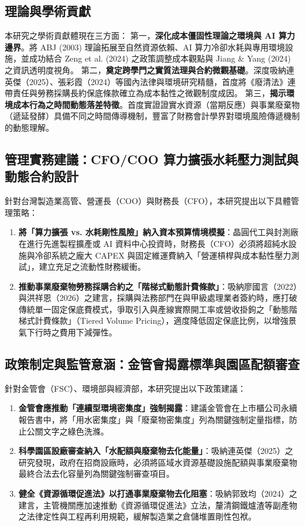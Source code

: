 \documentclass[12pt,a4paper]{article}
\begin{document}
\subsection{理論與學術貢獻}

本研究之學術貢獻體現在三方面：
第一，\textbf{深化成本僵固性理論之環境與 AI 算力邊界}。將 ABJ (2003) 理論拓展至自然資源依賴、AI 算力冷卻水耗與專用環境設施，並成功結合 Zeng et al. (2024) 之政策調整成本觀點與 Jiang \& Yang (2024) 之資訊透明度視角。
第二，\textbf{奠定跨學門之實質法理與合約微觀基礎}。深度吸納連英傑（2025）、張彩霞（2024）等國內法律與環境研究精髓，首度將《廢清法》連帶責任與勞務採購長約保底條款確立為成本黏性之微觀制度成因。
第三，\textbf{揭示環境成本行為之時間動態落差特徵}。首度實證證實水資源（當期反應）與事業廢棄物（遞延發酵）具備不同之時間傳導機制，豐富了財務會計學界對環境風險傳遞機制的動態理解。

\subsection{管理實務建議：CFO/COO 算力擴張水耗壓力測試與動態合約設計}

針對台灣製造業高管、營運長（COO）與財務長（CFO），本研究提出以下具體管理策略：

\begin{enumerate}[leftmargin=*]
    \item \textbf{將「算力擴張 vs. 水耗剛性風險」納入資本預算情境模擬}：晶圓代工與封測廠在進行先進製程擴產或 AI 資料中心投資時，財務長（CFO）必須將超純水設施與冷卻系統之龐大 CAPEX 與固定維運費納入「營運槓桿與成本黏性壓力測試」，建立充足之流動性財務緩衝。
    \item \textbf{推動事業廢棄物勞務採購合約之「階梯式動態計費條款」}：吸納廖國言（2022）與洪祥恩（2026）之建言，採購與法務部門在與甲級處理業者簽約時，應打破傳統單一固定保底費模式，爭取引入與產線實際開工率或營收掛鉤之「動態階梯式計費條款」（Tiered Volume Pricing），適度降低固定保底比例，以增強景氣下行時之費用下減彈性。
\end{enumerate}

\subsection{政策制定與監管意涵：金管會揭露標準與園區配額審查}

針對金管會（FSC）、環境部與經濟部，本研究提出以下政策建議：

\begin{enumerate}[leftmargin=*]
    \item \textbf{金管會應推動「連續型環境密集度」強制揭露}：建議金管會在上市櫃公司永續報告書中，將「用水密集度」與「廢棄物密集度」列為關鍵強制定量指標，防止公關文字之綠色洗滌。
    \item \textbf{科學園區設廠審查納入「水配額與廢棄物去化能量」}：吸納連英傑（2025）之研究發現，政府在招商設廠時，必須將區域水資源基礎設施配額與事業廢棄物最終合法去化容量列為關鍵強制審查項目。
    \item \textbf{健全《資源循環促進法》以打通事業廢棄物去化阻塞}：吸納郭致均（2024）之建言，主管機關應加速推動《資源循環促進法》立法，釐清鋼鐵爐渣等副產物之法律定性與工程再利用規範，緩解製造業之倉儲堆置剛性包袱。
\end{enumerate}
\end{document}
